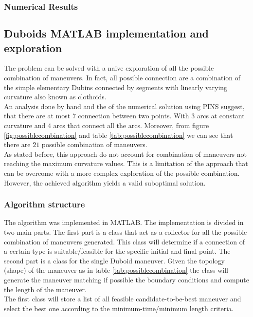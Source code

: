 \documentclass[11pt,twocolumn]{scrartcl}
\begin{document}
\subsubsection*{Numerical Results}



%
%
\subsection*{Duboids MATLAB implementation and exploration}
%
The problem can be solved with a naive exploration of all the possible combination of maneuvers. In fact, all possible connection are a combination of the simple elementary Dubins connected by segments with linearly varying curvature also known as clothoids.\cite{bertolazzi2015g1}\\
An analysis done by hand and the of the numerical solution using PINS suggest, that there are at most $7$ connection between two points. With $3$ arcs at constant curvature and $4$ arcs that connect all the arcs. Moreover, from figure \ref{fig:possiblecombination} and table \ref{tab:possiblecombination} we can see that there are $21$ possible combination of maneuvers.\\
As stated before, this approach do not account for combination of maneuvers not reaching the maximum curvature values. This is a limitation of the approach that can be overcome with a more complex exploration of the possible combination. However, the achieved algorithm yields a valid suboptimal solution.
%
\subsubsection*{Algorithm structure}
%
The algorithm was implemented in MATLAB. The implementation is divided in two main parts. The first part is a class that act as a collector for all the possible combination of maneuvers generated. This class will determine if a connection of a certain type is suitable/feasible for the specific initial and final point. The second part is a class for the single Duboid maneuver. Given the topology (shape) of the maneuver as in table \ref{tab:possiblecombination} the class will generate the maneuver matching if possible the boundary conditions and compute the length of the maneuver.\\
The first class will store a list of all feasible candidate-to-be-best maneuver and select the best one according to the minimum-time/minimum length criteria.
%
\end{document}
